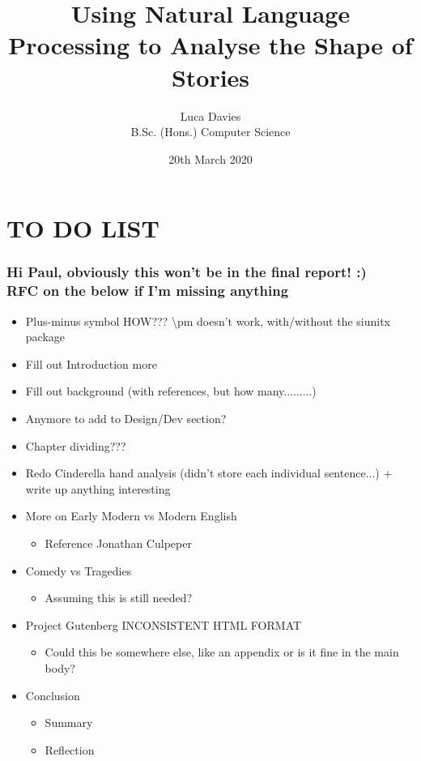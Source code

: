 \documentclass{article}
\title{\textbf{Using Natural Language Processing to Analyse the Shape of Stories}}
\author{
Luca Davies \\ B.Sc. (Hons.) Computer Science}
\date{20th March 2020}
\begin{document}
\maketitle
\newpage
\section*{TO DO LIST}
\subsubsection*{Hi Paul, obviously this won't be in the final report! :) \\ RFC on the below if I'm missing anything}
    \begin{itemize}
        \item Plus-minus symbol HOW??? \textbackslash pm doesn't work, with/without the siunitx package
        \item Fill out Introduction more 
        \item Fill out background (with references, but how many.........)
        \item Anymore to add to Design/Dev section?
        \item Chapter dividing???
        \item Redo Cinderella hand analysis (didn't store each individual sentence...) + write up anything interesting
        \item More on Early Modern vs Modern English
            \begin{itemize}
                \item Reference Jonathan Culpeper
            \end{itemize}
        \item Comedy vs Tragedies
            \begin{itemize}
                \item Assuming this is still needed?
            \end{itemize}
        \item Project Gutenberg INCONSISTENT HTML FORMAT
            \begin{itemize}
                \item Could this be somewhere else, like an appendix or is it fine in the main body?
            \end{itemize}
        \item Conclusion
            \begin{itemize}
                \item Summary
                \item Reflection
            \end{itemize}
    \end{itemize}
\end{document}
